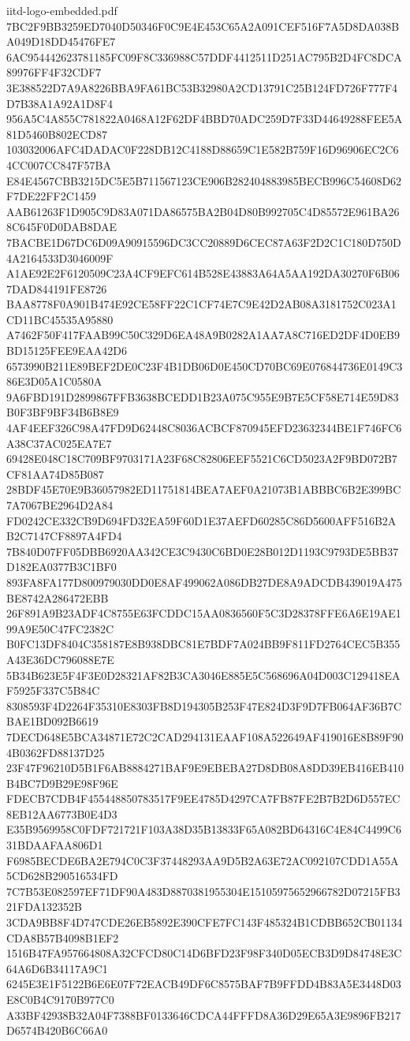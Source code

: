 \begin{filecontents*}[overwrite]{iitd-logo-embedded.pdf}
7BC2F9BB3259ED7040D50346F0C9E4E453C65A2A091CEF516F7A5D8DA038BA049D18DD45476FE7
6AC954442623781185FC09F8C336988C57DDF4412511D251AC795B2D4FC8DCA89976FF4F32CDF7
3E388522D7A9A8226BBA9FA61BC53B32980A2CD13791C25B124FD726F777F4D7B38A1A92A1D8F4
956A5C4A855C781822A0468A12F62DF4BBD70ADC259D7F33D44649288FEE5A81D5460B802ECD87
103032006AFC4DADAC0F228DB12C4188D88659C1E582B759F16D96906EC2C64CC007CC847F57BA
E84E4567CBB3215DC5E5B711567123CE906B282404883985BECB996C54608D62F7DE22FF2C1459
AAB61263F1D905C9D83A071DA86575BA2B04D80B992705C4D85572E961BA268C645F0D0DAB8DAE
7BACBE1D67DC6D09A90915596DC3CC20889D6CEC87A63F2D2C1C180D750D4A2164533D3046009F
A1AE92E2F6120509C23A4CF9EFC614B528E43883A64A5AA192DA30270F6B067DAD844191FE8726
BAA8778F0A901B474E92CE58FF22C1CF74E7C9E42D2AB08A3181752C023A1CD11BC45535A95880
A7462F50F417FAAB99C50C329D6EA48A9B0282A1AA7A8C716ED2DF4D0EB9BD15125FEE9EAA42D6
6573990B211E89BEF2DE0C23F4B1DB06D0E450CD70BC69E076844736E0149C386E3D05A1C0580A
9A6FBD191D2899867FFB3638BCEDD1B23A075C955E9B7E5CF58E714E59D83B0F3BF9BF34B6B8E9
4AF4EEF326C98A47FD9D62448C8036ACBCF870945EFD23632344BE1F746FC6A38C37AC025EA7E7
69428E048C18C709BF9703171A23F68C82806EEF5521C6CD5023A2F9BD072B7CF81AA74D85B087
28BDF45E70E9B36057982ED11751814BEA7AEF0A21073B1ABBBC6B2E399BC7A7067BE2964D2A84
FD0242CE332CB9D694FD32EA59F60D1E37AEFD60285C86D5600AFF516B2AB2C7147CF8897A4FD4
7B840D07FF05DBB6920AA342CE3C9430C6BD0E28B012D1193C9793DE5BB37D182EA0377B3C1BF0
893FA8FA177D800979030DD0E8AF499062A086DB27DE8A9ADCDB439019A475BE8742A286472EBB
26F891A9B23ADF4C8755E63FCDDC15AA0836560F5C3D28378FFE6A6E19AE199A9E50C47FC2382C
B0FC13DF8404C358187E8B938DBC81E7BDF7A024BB9F811FD2764CEC5B355A43E36DC796088E7E
5B34B623E5F4F3E0D28321AF82B3CA3046E885E5C568696A04D003C129418EAF5925F337C5B84C
8308593F4D2264F35310E8303FB8D194305B253F47E824D3F9D7FB064AF36B7CBAE1BD092B6619
7DECD648E5BCA34871E72C2CAD294131EAAF108A522649AF419016E8B89F904B0362FD88137D25
23F47F96210D5B1F6AB8884271BAF9E9EBEBA27D8DB08A8DD39EB416EB410B4BC7D9B29E98F96E
FDECB7CDB4F455448850783517F9EE4785D4297CA7FB87FE2B7B2D6D557EC8EB12AA6773B0E4D3
E35B9569958C0FDF721721F103A38D35B13833F65A082BD64316C4E84C4499C631BDAAFAA806D1
F6985BECDE6BA2E794C0C3F37448293AA9D5B2A63E72AC092107CDD1A55A5CD628B290516534FD
7C7B53E082597EF71DF90A483D8870381955304E15105975652966782D07215FB321FDA132352B
3CDA9BB8F4D747CDE26EB5892E390CFE7FC143F485324B1CDBB652CB01134CDA8B57B4098B1EF2
1516B47FA957664808A32CFCD80C14D6BFD23F98F340D05ECB3D9D84748E3C64A6D6B34117A9C1
6245E3E1F5122B6E6E07F72EACB49DF6C8575BAF7B9FFDD4B83A5E3448D03E8C0B4C9170B977C0
A33BF42938B32A04F7388BF0133646CDCA44FFFD8A36D29E65A3E9896FB217D6574B420B6C66A0

\end{filecontents*}
